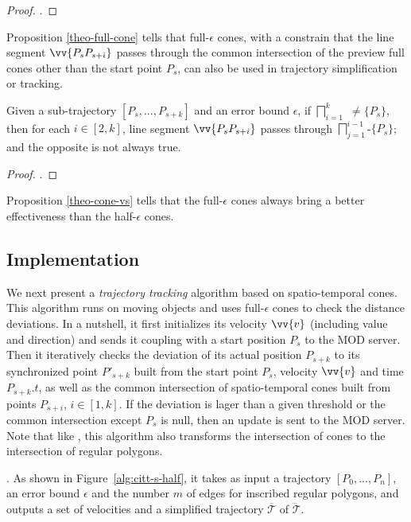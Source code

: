 \begin{proof}
	\todo.
\end{proof}

Proposition \ref{theo-full-cone} tells that full-$\epsilon$ cones, with a constrain that the line segment $\vv{P_sP_{s+i}}$ passes through the common intersection of the preview full cones other than the start point $P_s$, can also be used in trajectory simplification or tracking. 

\begin{proposition}
	\label{theo-cone-vs}
	Given a sub-trajectory $[P_s,...,P_{s+k}]$ and an error bound $\epsilon$, if $\bigsqcap_{i=1}^{k}$ $\ne \{P_s\}$, then for each $i \in [2, k]$, line segment $\vv{P_sP_{s+i}}$ passes through $\bigsqcap_{j=1}^{i-1}$-$\{P_s\}$; and the opposite is not always true.
\end{proposition}

\begin{proof}
	\todo.
\end{proof}

Proposition \ref{theo-cone-vs} tells that the full-$\epsilon$ cones always bring a better effectiveness than the half-$\epsilon$ cones.

\subsection{Implementation}

We next present a {\em trajectory tracking} algorithm based on spatio-temporal cones. This algorithm runs on moving objects and uses full-$\epsilon$ cones to check the distance deviations. In a nutshell, it first initializes its velocity $\vv{v}$ (including value and direction) and sends it coupling with a start position $P_s$ to the MOD server. Then it iteratively checks the deviation of its actual position $P_{s+k}$ to its synchronized point $P'_{s+k}$ built from the start point $P_s$, velocity $\vv{v}$ and time $P_{s+k}.t$, as well as the common intersection of spatio-temporal cones built from points $P_{s+i}$, $i \in [1, k]$. If the deviation is lager than a given threshold or the common intersection except $P_s$ is null, then an update is sent to the MOD server. Note that like \cised, this algorithm also transforms the intersection of cones to the intersection of regular polygons.


.
As shown in Figure~\ref{alg:citt-s-half}, it takes as input a trajectory ${[P_0, \ldots, P_n]}$, an error bound $\epsilon$ and the number $m$ of edges for inscribed regular polygons, and outputs a set of velocities and a simplified  trajectory $\overline{\mathcal{T}}$ of $\dddot{\mathcal{T}}$.


